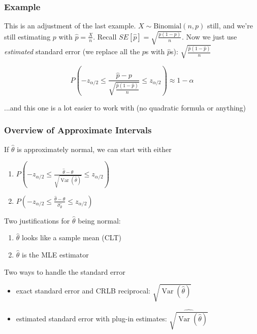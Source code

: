 \documentclass{beamer}
\begin{document}
\begin{frame}
\frametitle{Example}


This is an adjustment of the last example. $X \sim \text{Binomial}(n,p)$ still, and we're still estimating $p$ with $\hat{p} = \frac{X}{n}$. Recall $SE[\hat{p}] = \sqrt{\frac{p(1-p)}{n}}$. Now we just use \emph{estimated} standard error (we replace all the $p$s with $\hat{p}$s): $\sqrt{\frac{ \hat{p} (1- \hat{p} )}{n}}$
\newline

\[
P \left( - z_{\alpha/2} \le \frac{\hat{p} - p}{ \sqrt{\frac{ \hat{p} (1- \hat{p} )}{n}} } \le z_{\alpha/2} \right) \approx 1 - \alpha
\]

...and this one is a lot easier to work with (no quadratic formula or anything)


\end{frame}
\begin{frame}
\frametitle{Overview of Approximate Intervals}

If $\hat{\theta}$ is approximately normal, we can start with either

\begin{enumerate}
\item $P(-z_{\alpha/2} \le \frac{\hat{\theta}-\theta }{\sqrt{\operatorname{Var}\left(\hat{\theta} \right)} } \le z_{\alpha/2})$
\item $P(-z_{\alpha/2} \le \frac{\hat{\theta}-\theta }{\widehat{\sigma_{\hat{\theta}}} } \le z_{\alpha/2})$
\end{enumerate}

Two justifications for $\hat{\theta}$ being normal:
\begin{enumerate}
\item $\hat{\theta}$ looks like a sample mean (CLT)
\item $\hat{\theta}$ is the MLE estimator
\end{enumerate}

Two ways to handle the standard error
\begin{itemize}
\item exact standard error and CRLB reciprocal: $\sqrt{\operatorname{Var}\left(\hat{\theta} \right)}$
\item estimated standard error with plug-in estimates: $\widehat{\sqrt{\operatorname{Var}\left( \hat{\theta} \right)}}$
\end{itemize}

\end{frame}
\end{document}

